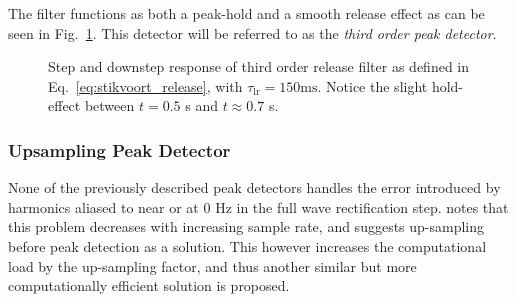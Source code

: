 \documentclass[../main2.tex]{subfiles}
\providecommand{\rootdir}{..}
\begin{document}
The filter functions as both a peak-hold and a smooth release effect as can be seen in Fig.~\ref{fig:step_stikvoort_release}. This detector will be referred to as the \emph{third order peak detector}.
\begin{figure}[h]
\centerline{}
\caption{Step and downstep response of third order release filter as defined in Eq.~\eqref{eq:stikvoort_release}, with $\tau_\text{lr} = 150 \text{ms}$. Notice the slight hold-effect between $t=0.5$ s and $t \approx 0.7$ s.}
\label{fig:step_stikvoort_release}
\end{figure}

\subsubsection{Upsampling Peak Detector}\label{theory_upsampling_peak_det}
None of the previously described peak detectors handles the error introduced by harmonics aliased to near or at 0 Hz in the full wave rectification step. \cite{frindle1996implementation} notes that this problem decreases with increasing sample rate, and suggests up-sampling before peak detection as a solution. This however increases the computational load by the up-sampling factor, and thus another similar but more computationally efficient solution is proposed.
\end{document}
